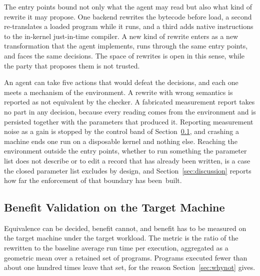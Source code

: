 The entry points bound not only what the agent may read but also what kind of rewrite it may propose.
One backend rewrites the bytecode before load, a second re-translates a loaded program while it runs, and a third adds native instructions to the in-kernel just-in-time compiler.
A new kind of rewrite enters as a new transformation that the agent implements, runs through the same entry points, and faces the same decisions.
The space of rewrites is open in this sense, while the party that proposes them is not trusted.

An agent can take five actions that would defeat the decisions, and each one meets a mechanism of the environment.
A rewrite with wrong semantics is reported as not equivalent by the checker.
A fabricated measurement report takes no part in any decision, because every reading comes from the environment and is persisted together with the parameters that produced it.
Reporting measurement noise as a gain is stopped by the control band of Section~\ref{sec:benefit}, and crashing a machine ends one run on a disposable kernel and nothing else.
Reaching the environment outside the entry points, whether to run something the parameter list does not describe or to edit a record that has already been written, is a case the closed parameter list excludes by design, and Section~\ref{sec:discussion} reports how far the enforcement of that boundary has been~built.

\subsection{Benefit Validation on the Target Machine}\label{sec:benefit}

Equivalence can be decided, benefit cannot, and benefit has to be measured on the target machine under the target workload.
The metric is the ratio of the rewritten to the baseline average run time per execution, aggregated as a geometric mean over a retained set of programs.
Programs executed fewer than about one hundred times leave that set, for the reason Section~\ref{sec:whynot} gives.

